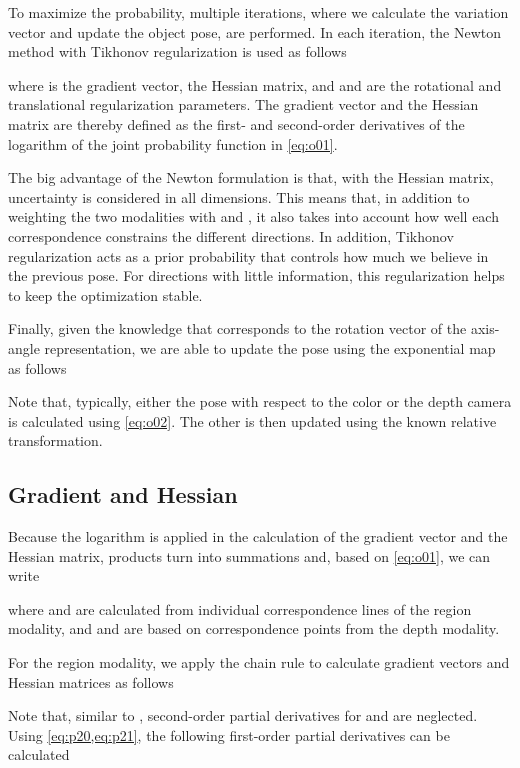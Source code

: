 \documentclass[10pt,twocolumn,letterpaper]{article}
\begin{document}
To maximize the probability, multiple iterations, where we calculate the variation vector  and update the object pose, are performed.
In each iteration, the Newton method with Tikhonov regularization is used as follows

where  is the gradient vector,  the Hessian matrix, and  and  are the rotational and translational regularization parameters.
The gradient vector and the Hessian matrix are thereby defined as the first- and second-order derivatives of the logarithm of the joint probability function in \cref{eq:o01}.

The big advantage of the Newton formulation is that, with the Hessian matrix, uncertainty is considered in all dimensions.
This means that, in addition to weighting the two modalities with  and , it also takes into account how well each correspondence constrains the different directions.
In addition, Tikhonov regularization acts as a prior probability that controls how much we believe in the previous pose.
For directions with little information, this regularization helps to keep the optimization stable.

Finally, given the knowledge that  corresponds to the rotation vector of the axis-angle representation, we are able to update the pose using the exponential map as follows 

Note that, typically, either the pose with respect to the color or the depth camera is calculated using \cref{eq:o02}.
The other is then updated using the known relative transformation.


\subsection{Gradient and Hessian}\label{ssec:o1}
Because the logarithm is applied in the calculation of the gradient vector and the Hessian matrix, products turn into summations and, based on \cref{eq:o01}, we can write

where  and  are calculated from individual correspondence lines of the region modality, and  and  are based on correspondence points from the depth modality.

For the region modality, we apply the chain rule to calculate gradient vectors and Hessian matrices as follows

Note that, similar to \cite{Stoiber2020b}, second-order partial derivatives for  and  are neglected.
Using \cref{eq:p20,eq:p21}, the following first-order partial derivatives can be calculated
\end{document}
